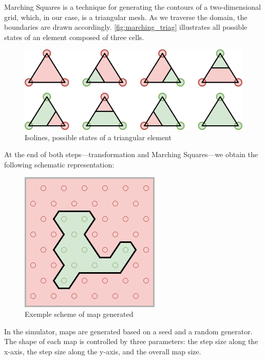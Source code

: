 \documentclass[../main.tex]{subfiles}
\begin{document}
Marching Squares is a technique for generating the contours of a two-dimensional grid, which, in our case, is a triangular mesh. As we traverse the domain, the boundaries are drawn accordingly. \autoref{fig:marching_triag} illustrates all possible states of an element composed of three cells.

\begin{figure}[H]
	\centering
	\includegraphics[width=0.6\linewidth]{IMAGES/part2/marching_square_triangle.png}
	\caption{Isolines, possible states of a triangular element}
	\label{fig:marching_triag}
\end{figure}

At the end of both steps—transformation and Marching Squares—we obtain the following schematic representation:

\begin{figure}[H]
	\centering
	\includegraphics[width=0.3\linewidth]{IMAGES/part2/map_generation_example.png}
	\caption{Exemple scheme of map generated}
	\label{fig:map_gen_scheme}
\end{figure}

In the simulator, maps are generated based on a seed and a random generator. The shape of each map is controlled by three parameters: the step size along the x-axis, the step size along the y-axis, and the overall map size.
\end{document}
